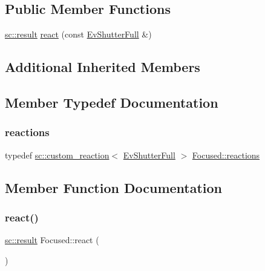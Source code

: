 \subsection*{Public Member Functions}
\begin{DoxyCompactItemize}
\item 
\mbox{\hyperlink{namespaceboost_1_1statechart_abe807f6598b614d6d87bb951ecd92331}{sc\+::result}} \mbox{\hyperlink{struct_focused_a347f52c7524b336e5f2523f1ce6a1b42}{react}} (const \mbox{\hyperlink{struct_ev_shutter_full}{Ev\+Shutter\+Full}} \&)
\end{DoxyCompactItemize}
\subsection*{Additional Inherited Members}


\subsection{Member Typedef Documentation}
\mbox{\label{struct_focused_a4c79851d21e90dd5408133ea35aa6fac}} 
\subsubsection{\texorpdfstring{reactions}{reactions}}
{\footnotesize\ttfamily typedef \mbox{\hyperlink{classboost_1_1statechart_1_1custom__reaction}{sc\+::custom\+\_\+reaction}}$<$ \mbox{\hyperlink{struct_ev_shutter_full}{Ev\+Shutter\+Full}} $>$ \mbox{\hyperlink{struct_focused_a4c79851d21e90dd5408133ea35aa6fac}{Focused\+::reactions}}}



\subsection{Member Function Documentation}
\mbox{\label{struct_focused_a347f52c7524b336e5f2523f1ce6a1b42}} 
\subsubsection{\texorpdfstring{react()}{react()}}
{\footnotesize\ttfamily \mbox{\hyperlink{namespaceboost_1_1statechart_abe807f6598b614d6d87bb951ecd92331}{sc\+::result}} Focused\+::react (\begin{DoxyParamCaption}\item[{const \mbox{\hyperlink{struct_ev_shutter_full}{Ev\+Shutter\+Full}} \&}]{ }\end{DoxyParamCaption})}

